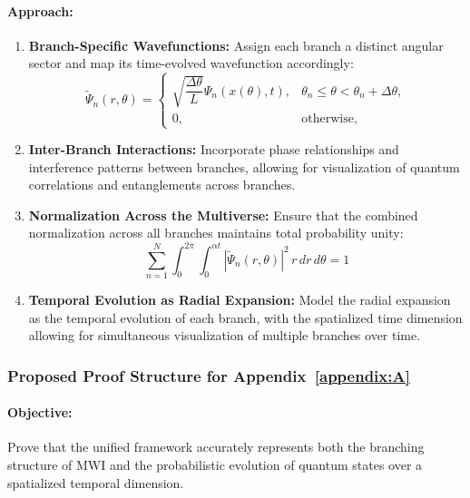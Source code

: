 \documentclass[12pt]{article}
\begin{document}
\paragraph{Approach:}
\begin{enumerate}
    \item \textbf{Branch-Specific Wavefunctions:}
    Assign each branch a distinct angular sector and map its time-evolved wavefunction accordingly:
    \[
    \tilde{\Psi}_n(r, \theta) =
    \begin{cases}
    \sqrt{\dfrac{\Delta\theta}{L}} \Psi_n(x(\theta), t), & \theta_n \leq \theta < \theta_n + \Delta\theta, \\
    0, & \text{otherwise},
    \end{cases}
    \]
    
    \item \textbf{Inter-Branch Interactions:}
    Incorporate phase relationships and interference patterns between branches, allowing for visualization of quantum correlations and entanglements across branches.
    
    \item \textbf{Normalization Across the Multiverse:}
    Ensure that the combined normalization across all branches maintains total probability unity:
    \[
    \sum_{n=1}^{N} \int_{0}^{2\pi} \int_{0}^{\alpha t} |\tilde{\Psi}_n(r,\theta)|^2 \, r \, dr \, d\theta = 1
    \]
    
    \item \textbf{Temporal Evolution as Radial Expansion:}
    Model the radial expansion as the temporal evolution of each branch, with the spatialized time dimension allowing for simultaneous visualization of multiple branches over time.
\end{enumerate}

\subsubsection{Proposed Proof Structure for Appendix~\ref{appendix:A}}
\paragraph{Objective:} Prove that the unified framework accurately represents both the branching structure of MWI and the probabilistic evolution of quantum states over a spatialized temporal dimension.
\end{document}
